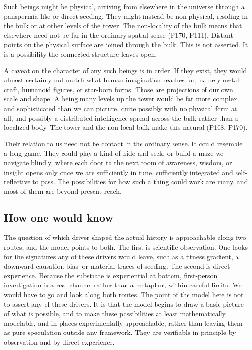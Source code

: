 Such beings might be physical, arriving from elsewhere in the universe through a panspermia-like or direct seeding. They might instead be non-physical, residing in the bulk or at other levels of the tower. The non-locality of the bulk means that elsewhere need not be far in the ordinary spatial sense (P170, P111). Distant points on the physical surface are joined through the bulk. This is not asserted. It is a possibility the connected structure leaves open.

A caveat on the character of any such beings is in order. If they exist, they would almost certainly not match what human imagination reaches for, namely metal craft, humanoid figures, or star-born forms. Those are projections of our own scale and shape. A being many levels up the tower would be far more complex and sophisticated than we can picture, quite possibly with no physical form at all, and possibly a distributed intelligence spread across the bulk rather than a localized body. The tower and the non-local bulk make this natural (P108, P170).

Their relation to us need not be contact in the ordinary sense. It could resemble a long game. They could play a kind of hide and seek, or build a maze we navigate blindly, where each door to the next room of awareness, wisdom, or insight opens only once we are sufficiently in tune, sufficiently integrated and self-reflective to pass. The possibilities for how such a thing could work are many, and most of them are beyond present reach.

\subsection{How one would know}

The question of which driver shaped the actual history is approachable along two routes, and the model points to both. The first is scientific observation. One looks for the signatures any of these drivers would leave, such as a fitness gradient, a downward-causation bias, or material traces of seeding. The second is direct experience. Because the substrate is experiential at bottom, first-person investigation is a real channel rather than a metaphor, within careful limits. We would have to go and look along both routes. The point of the model here is not to assert any of these drivers. It is that the model begins to draw a basic picture of what is possible, and to make these possibilities at least mathematically modelable, and in places experimentally approachable, rather than leaving them as pure speculation outside any framework. They are verifiable in principle by observation and by direct experience.


